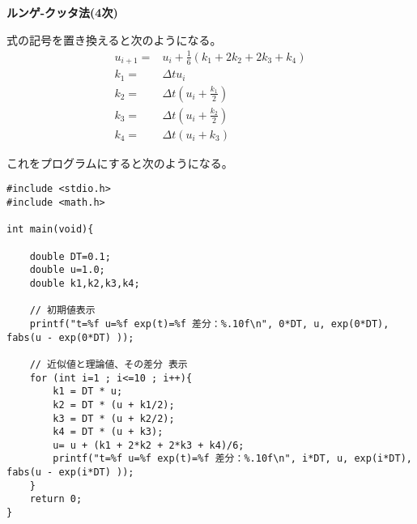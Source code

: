 \documentclass[12pt,b5paper]{ltjsarticle}
\begin{document}
\dotfill
\textbf{ルンゲ-クッタ法(4次)}
\dotfill

式の記号を置き換えると次のようになる。
\begin{align}
 u_{i+1} =& u_{i} + \frac{1}{6}(k_1+2k_2+2k_3+k_4)\\
 k_1 =& \Delta t u_{i}\\
 k_2 =& \Delta t \left( u_{i}+\frac{k_1}{2} \right)\\
 k_3 =& \Delta t \left( u_{i}+\frac{k_2}{2} \right)\\
 k_4 =& \Delta t (u_{i}+k_3)
\end{align}

これをプログラムにすると次のようになる。


\newpage

\begin{lstlisting}
#include <stdio.h>
#include <math.h>

int main(void){

    double DT=0.1;
    double u=1.0;
    double k1,k2,k3,k4;

    // 初期値表示
    printf("t=%f u=%f exp(t)=%f 差分：%.10f\n", 0*DT, u, exp(0*DT), fabs(u - exp(0*DT) ));

    // 近似値と理論値、その差分 表示
    for (int i=1 ; i<=10 ; i++){
        k1 = DT * u;
        k2 = DT * (u + k1/2);
        k3 = DT * (u + k2/2);
        k4 = DT * (u + k3);
        u= u + (k1 + 2*k2 + 2*k3 + k4)/6;
        printf("t=%f u=%f exp(t)=%f 差分：%.10f\n", i*DT, u, exp(i*DT), fabs(u - exp(i*DT) ));
    }
    return 0;
}
\end{lstlisting}
\end{document}
